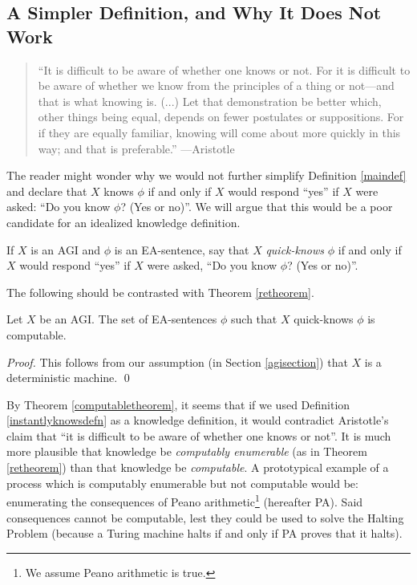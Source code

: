 \documentclass[runningheads]{llncs}
\begin{document}
\subsection{A Simpler Definition, and Why It Does Not Work}

\begin{quote}
  ``It is difficult to be aware of whether one knows or not.
  For it is difficult to be aware of whether we know from the
  principles of a thing or not---and that is what knowing is.
  (...)
  Let that demonstration be better which, other things
  being equal, depends on fewer postulates or suppositions.
  For if they are equally familiar, knowing will come about
  more quickly in this way; and that is preferable.''
  ---Aristotle \cite{aristotle}
\end{quote}

The reader might wonder why we would not further simplify Definition \ref{maindef}
and declare that $X$ knows $\phi$ if and only if $X$ would respond ``yes'' if
$X$ were asked: ``Do you know $\phi$? (Yes or no)''.
We will argue that this would be a poor candidate for an idealized knowledge
definition.

\begin{definition}
\label{instantlyknowsdefn}
  If $X$ is an AGI and $\phi$ is an EA-sentence, say that $X$ \emph{quick-knows}
  $\phi$ if and only if $X$ would respond ``yes'' if $X$ were asked,
  ``Do you know $\phi$? (Yes or no)''.
\end{definition}

The following should be contrasted with Theorem \ref{retheorem}.

\begin{theorem}
\label{computabletheorem}
  Let $X$ be an AGI.
  The set of EA-sentences $\phi$ such that $X$ quick-knows $\phi$ is computable.
\end{theorem}

\begin{proof}
  This follows from our assumption (in Section \ref{agisection}) that
  $X$ is a deterministic machine.
  \qed
\end{proof}

By Theorem \ref{computabletheorem}, it seems that if we used
Definition \ref{instantlyknowsdefn} as a knowledge definition, it would
contradict Aristotle's claim that
``it is difficult to be aware of whether one
knows or not''. It is much more plausible that knowledge be \emph{computably enumerable}
(as in Theorem \ref{retheorem}) than that knowledge be \emph{computable}.
A prototypical example of a process which is computably enumerable but not computable
would be: enumerating the consequences of Peano arithmetic\footnote{We assume Peano
arithmetic is true.} (hereafter PA).
Said consequences cannot be computable, lest they could be used to solve the Halting
Problem (because a Turing machine halts if and only if PA proves that it halts).
\end{document}
